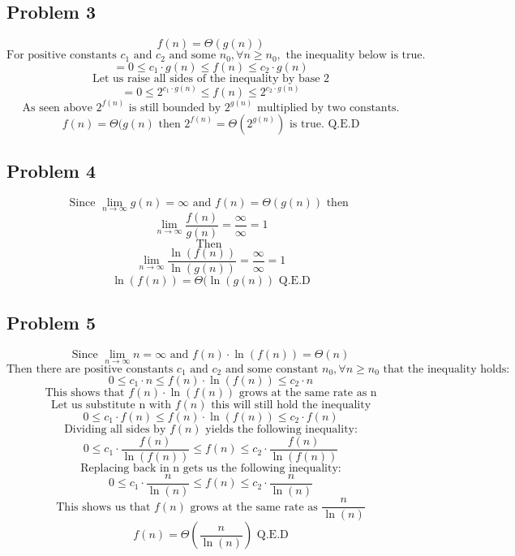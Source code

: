 \documentclass{article}
\begin{document}
\subsection{Problem 3}

$$f(n) = \Theta(g(n)) $$
$$\text{For positive constants } c_1 \text{ and } c_2 \text{ and some } n_0, \forall n \ge n_0, \text{ the inequality below is true.}$$
$$= 0 \le c_1 \cdot g(n) \le f(n) \le c_2 \cdot g(n) $$
$$\text{Let us raise all sides of the inequality by base 2}$$
$$= 0 \le 2^{c_1 \cdot g(n)} \le f(n) \le 2^{c_2 \cdot g(n)} $$
$$\text{As seen above } 2^{f(n)} \text{ is still bounded by } 2^{g(n)} \text{ multiplied by two constants.}$$
$$f(n) = \Theta(g(n) \text{ then } 2^{f(n)} = \Theta(2^{g(n)}) \text{ is true. Q.E.D} $$

\subsection{Problem 4}

$$\text{Since } \lim_{n \rightarrow \infty} g(n) = \infty \text{ and } f(n) = \Theta(g(n)) \text{ then } $$
$$\lim_{n \rightarrow \infty} \frac{f(n)}{g(n)} = \frac{\infty}{\infty} = 1$$
$$\text{Then }$$
$$\lim_{n \rightarrow \infty} \frac{\ln(f(n))}{\ln(g(n))} = \frac{\infty}{\infty} = 1$$
$$\ln(f(n)) = \Theta(\ln(g(n)) \text{ Q.E.D}$$

\subsection{Problem 5}

$$\text{Since } \lim_{n \rightarrow \infty} n = \infty \text{ and } f(n) \cdot \ln(f(n)) = \Theta(n) $$
$$\text{Then there are positive constants } c_1 \text{ and } c_2 \text{ and some constant } n_0, \forall n \ge n_0 \text{ that the inequality holds:}$$
$$0 \le c_1 \cdot n \le f(n) \cdot \ln(f(n)) \le c_2 \cdot n$$
$$\text{This shows that } f(n)\cdot\ln(f(n)) \text{ grows at the same rate as n}$$
$$\text{Let us substitute n with } f(n) \text{ this will still hold the inequality}$$
$$0 \le c_1 \cdot f(n) \le f(n) \cdot \ln(f(n)) \le c_2 \cdot f(n)$$
$$\text{Dividing all sides by } f(n) \text{ yields the following inequality:}$$
$$0 \le c_1 \cdot \frac{f(n)}{\ln(f(n))} \le f(n) \le c_2 \cdot \frac{f(n)}{\ln(f(n))}$$
$$\text{Replacing back in n gets us the following inequality:}$$
$$0 \le c_1 \cdot \frac{n}{\ln(n)} \le f(n) \le c_2 \cdot \frac{n}{\ln(n)}$$
$$\text{This shows us that } f(n) \text{ grows at the same rate as } \frac{n}{\ln(n)}$$
$$f(n) = \Theta(\frac{n}{\ln(n)}) \text{ Q.E.D}$$
\end{document}
